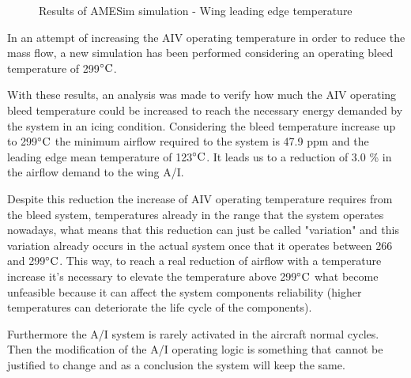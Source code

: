 \begin{figure}[H] %
    \caption{Results of AMESim simulation - Wing leading edge temperature}
    \label{fig:ResAMESimWingLeadEdge}
\end{figure}

In an attempt of increasing the AIV operating temperature in order to reduce the mass flow, a new simulation has been performed considering an operating bleed temperature of 299$\celsius$.

With these results, an analysis was made to verify how much the AIV operating bleed temperature could be increased to reach the necessary energy demanded by the system in an icing condition. Considering the bleed temperature increase up to 299$\celsius$  the minimum airflow required to the system is 47.9 ppm and the leading edge mean temperature of 123$\celsius$. It leads us to a reduction of 3.0 \% in the airflow demand to the wing A/I.

Despite this reduction the increase of AIV operating temperature requires from the bleed system, temperatures already in the range that the system operates nowadays, what means that this reduction can just be called "variation" and this variation already occurs in the actual system once that it operates between 266 and 299$\celsius$. This way, to reach a real reduction of airflow with a temperature increase it's necessary to elevate the temperature above 299$\celsius$  what become unfeasible because it can affect the system components reliability (higher temperatures can deteriorate the life cycle of the components).

Furthermore the A/I system is rarely activated in the aircraft normal cycles. Then the modification of the A/I operating logic is something that cannot be justified to change and as a conclusion the system will keep the same.

